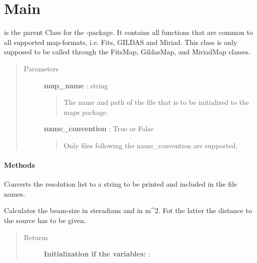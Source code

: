\documentclass[a4paper,10pt,english]{sphinxmanual}
\begin{document}
\section{Main}
\label{maps:main-label}\label{maps:main}

\begin{fulllineitems}
\label{maps:astrolyze.maps.main.Map}
 is the parent Class for the -package. It contains all
functions that are common to all supported map-formats, i.e. Fits,
GILDAS and Miriad. This class is only supposed to be called through
the FitsMap, GildasMap, and MiriadMap classes.
\begin{quote}\begin{description}
\item[{Parameters }] \leavevmode
\textbf{map\_name} : string
\begin{quote}

The name and path of the file that is to be initialized to the maps
package.
\end{quote}

\textbf{name\_convention} : True or False
\begin{quote}

Only files following the name\_convention are supported.
\end{quote}

\end{description}\end{quote}
\paragraph{Methods}

\begin{fulllineitems}
\label{maps:astrolyze.maps.main.Map.resolutionToString}
Converts the resolution list to a string to be printed and
included in the file names.

\end{fulllineitems}


\begin{fulllineitems}
\label{maps:astrolyze.maps.main.Map.get_beam_size}
Calculates the beam-size in steradians and in m\textasciicircum{}2. Fot the latter
the distance to the source has to be given.
\begin{quote}\begin{description}
\item[{Returns }] \leavevmode
\textbf{Initialization if the variables:} :


\end{description}
\end{quote}
\end{fulllineitems}
\end{fulllineitems}
\end{document}
